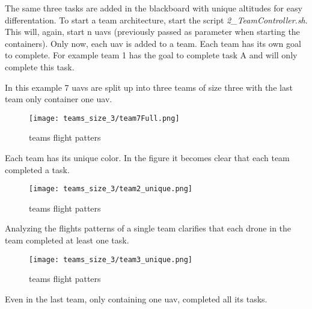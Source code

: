 The same three tasks are added in the blackboard with unique altitudes for easy differentation. To start a team architecture,
start the script \textit{2\_TeamController.sh}. This will, again, start n \acp{uav} (previously passed as parameter when starting the containers).
Only now, each \acs{uav} is added to a team. Each team has its own goal to complete. For example team 1 has the goal to complete task A and will
only complete this task.

In this example 7 \acp{uav} are split up into three teams of size three with the last team only container one \acs{uav}.

\begin{figure}[ht]
    \centering
    \texttt{[image: teams\_size\_3/team7Full.png]}
    \caption[teams architecture]{teams flight patters}
\end{figure}

Each team has its unique color. In the figure it becomes clear that each team completed a task. 

\newpage
\begin{figure}[ht]
    \centering
    \texttt{[image: teams\_size\_3/team2\_unique.png]}
    \caption[teams architecture]{teams flight patters}
\end{figure}

Analyzing the flights patterns of a single team clarifies that each drone in the team completed at least one task.

\begin{figure}[ht]
    \centering
    \texttt{[image: teams\_size\_3/team3\_unique.png]}
    \caption[teams architecture]{teams flight patters}
\end{figure}

Even in the last team, only containing one \acs{uav}, completed all its tasks.